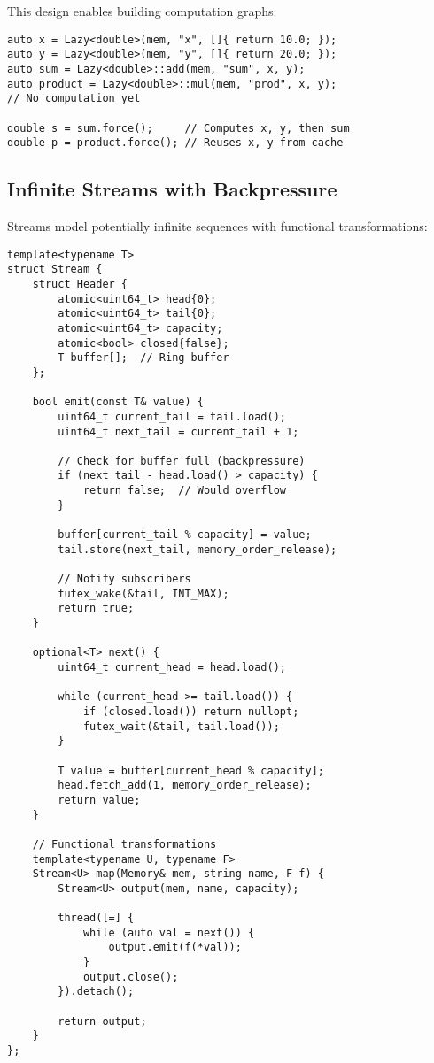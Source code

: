 \documentclass[letterpaper,twocolumn,10pt]{article}
\begin{document}
This design enables building computation graphs:

\begin{lstlisting}
auto x = Lazy<double>(mem, "x", []{ return 10.0; });
auto y = Lazy<double>(mem, "y", []{ return 20.0; });
auto sum = Lazy<double>::add(mem, "sum", x, y);
auto product = Lazy<double>::mul(mem, "prod", x, y);
// No computation yet

double s = sum.force();     // Computes x, y, then sum
double p = product.force(); // Reuses x, y from cache
\end{lstlisting}

\subsection{Infinite Streams with Backpressure}

Streams model potentially infinite sequences with functional transformations:

\begin{lstlisting}[caption={Stream Implementation with Ring Buffer}]
template<typename T>
struct Stream {
    struct Header {
        atomic<uint64_t> head{0};
        atomic<uint64_t> tail{0};
        atomic<uint64_t> capacity;
        atomic<bool> closed{false};
        T buffer[];  // Ring buffer
    };
    
    bool emit(const T& value) {
        uint64_t current_tail = tail.load();
        uint64_t next_tail = current_tail + 1;
        
        // Check for buffer full (backpressure)
        if (next_tail - head.load() > capacity) {
            return false;  // Would overflow
        }
        
        buffer[current_tail % capacity] = value;
        tail.store(next_tail, memory_order_release);
        
        // Notify subscribers
        futex_wake(&tail, INT_MAX);
        return true;
    }
    
    optional<T> next() {
        uint64_t current_head = head.load();
        
        while (current_head >= tail.load()) {
            if (closed.load()) return nullopt;
            futex_wait(&tail, tail.load());
        }
        
        T value = buffer[current_head % capacity];
        head.fetch_add(1, memory_order_release);
        return value;
    }
    
    // Functional transformations
    template<typename U, typename F>
    Stream<U> map(Memory& mem, string name, F f) {
        Stream<U> output(mem, name, capacity);
        
        thread([=] {
            while (auto val = next()) {
                output.emit(f(*val));
            }
            output.close();
        }).detach();
        
        return output;
    }
};
\end{lstlisting}
\end{document}

